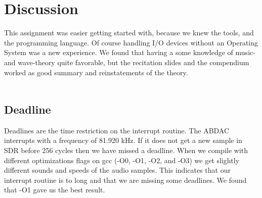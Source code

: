 \section{Discussion}
This assignment was easier getting started with, because we knew the tools,  
and the programming language.
Of course handling I/O devices without an Operating System was a new 
experience. We found that having a some
knowledge of music- and wave-theory quite favorable, but the recitation 
slides and the compendium worked as
good summary and reinstatements of the theory.\\
\\



\subsection{Deadline}
Deadlines are the time restriction on the interrupt routine. The ABDAC interrupts 
with a frequency of 81.920 kHz.
If it does not get a new sample in SDR before 256 cycles then we have missed a 
deadline. When we compile with
different optimizations flags on gcc (-O0, -O1, -O2, and -O3) we get slightly 
different sounds and speeds of the
audio samples. This indicates that our interrupt routine is to long and that 
we are missing some deadlines.
We found that -O1 gave us the best result.
